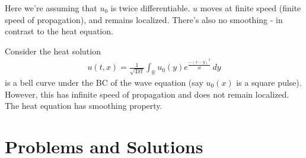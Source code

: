 \documentclass{book}
\theoremstyle{definition}
\newcommand{\R}{\mathbb{R}}
\newcommand{\f}[2]{\frac{#1}{#2}}
\begin{document}
\begin{enumerate}
	Here we're assuming that $u_0$ is twice differentiable. $u$ moves at finite speed (finite speed of propagation), and remains localized. There's also no smoothing - in contrast to the heat equation. 
	
	Consider the heat solution
	\begin{align*}
	u(t,x) = \f{1}{\sqrt{4\pi t}} \int_\R u_0(y)e^{\f{-(x-y)^2}{4t}}\,dy
	\end{align*}
	is a bell curve under the BC of the wave equation (say $u_0(x)$ is a square pulse). However, this has infinite speed of propagation and does not remain localized. The heat equation has smoothing property. 
\end{enumerate}










































\newpage

\chapter{Problems and Solutions}
\end{document}
